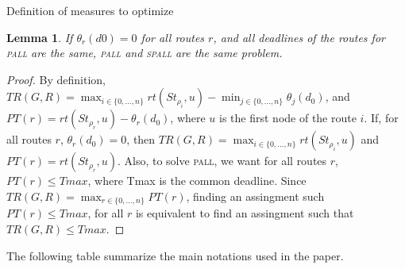\documentclass[10pt]{article}
\newtheorem{lemma}[theorem]{Lemma}
\newcommand\pall{\textsc{pall}\xspace}
\newcommand\spall{\textsc{spall}\xspace}
\begin{document}
\begin{subsubsection}{Definition of measures to optimize}
        \begin{lemma}
        If $\theta_r(d0) = 0$ for all routes $r$, and all deadlines of the routes for \pall are the same, \pall and \spall are the same problem.
          \end{lemma}
        \begin{proof}
        By definition, $TR(G,R) = \displaystyle \max_{i \in \{0,\ldots,n\}} rt(St_{\rho_i},u) - \displaystyle \min_{j \in \{0,\ldots,n\}} \theta_j(d_0)$, and $PT(r)= rt(St_{\rho_r},u) - \theta_r(d_0) $, where $u$ is the first node of the route $i$.\newline
        If, for all routes $r$, $\theta_r(d_0) = 0$, then $TR(G,R) = \displaystyle \max_{i \in \{0,\ldots,n\}} rt(St_{\rho_i},u)$ and $PT(r)= rt(St_{\rho_r},u)$.\newline
        Also, to solve \pall, we want for all routes $r$, $PT(r) \leq Tmax$, where Tmax is the common deadline.
        Since $TR(G,R) = \displaystyle \max_{r \in \{0,\ldots,n\}} PT(r)$, finding an assingment such $PT(r) \leq Tmax$, for all $r$ is equivalent to find an assingment such that $TR(G,R) \leq Tmax$.
        \end{proof}
        
      
        
        \end{subsubsection}
          The following table summarize the main notations used in the paper.
\end{document}

